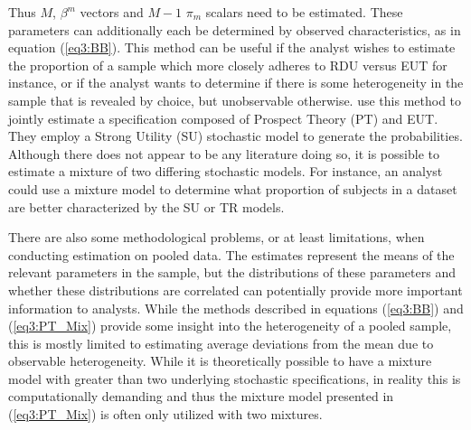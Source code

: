 \documentclass[../main.tex]{subfiles}
\begin{document}
\noindent Thus $M$, $\beta^m$ vectors and $M-1$ $\pi_m$ scalars need to be estimated.
These parameters can additionally each be determined by observed characteristics, as in equation (\ref{eq3:BB}).
This method can be useful if the analyst wishes to estimate the proportion of a sample which more closely adheres to RDU versus EUT for instance, or if the analyst wants to determine if there is some heterogeneity in the sample that is revealed by choice, but unobservable otherwise.
\textcite[141]{Harrison2008a} use this method to jointly estimate a specification composed of Prospect Theory (PT) and EUT.
They employ a Strong Utility (SU) stochastic model to generate the probabilities.
Although there does not appear to be any literature doing so, it is possible to estimate a mixture of two differing stochastic models.
For instance, an analyst could use a mixture model to determine what proportion of subjects in a dataset are better characterized by the SU or TR models.{\footnotemark}

\addtocounter{footnote}{-1}

There are also some methodological problems, or at least limitations, when conducting estimation on pooled data.
The estimates represent the means of the relevant parameters in the sample, but the distributions of these parameters and whether these distributions are correlated can potentially provide more important information to analysts.{\footnotemark}
While the methods described in equations (\ref{eq3:BB}) and (\ref{eq3:PT_Mix}) provide some insight into the heterogeneity of a pooled sample, this is mostly limited to estimating average deviations from the mean due to observable heterogeneity.
While it is theoretically possible to have a mixture model with greater than two underlying stochastic specifications, in reality this is computationally demanding and thus the mixture model presented in (\ref{eq3:PT_Mix}) is often only utilized with two mixtures.
\end{document}

